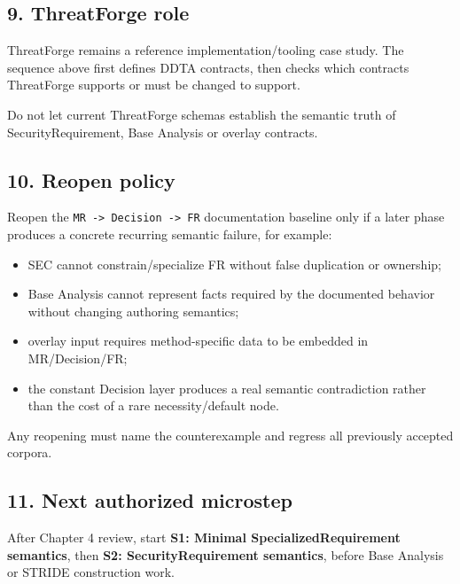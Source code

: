 \documentclass[
  11pt,
  a4paper,
]{article}
\providecommand{\tightlist}{%
  \setlength{\itemsep}{0pt}\setlength{\parskip}{0pt}}
\begin{document}
\subsection{9. ThreatForge role}\label{threatforge-role}

ThreatForge remains a reference implementation/tooling case study. The
sequence above first defines DDTA contracts, then checks which contracts
ThreatForge supports or must be changed to support.

Do not let current ThreatForge schemas establish the semantic truth of
SecurityRequirement, Base Analysis or overlay contracts.

\subsection{10. Reopen policy}\label{reopen-policy}

Reopen the \texttt{MR\ -\textgreater{}\ Decision\ -\textgreater{}\ FR}
documentation baseline only if a later phase produces a concrete
recurring semantic failure, for example:

\begin{itemize}
\tightlist
\item
  SEC cannot constrain/specialize FR without false duplication or
  ownership;
\item
  Base Analysis cannot represent facts required by the documented
  behavior without changing authoring semantics;
\item
  overlay input requires method-specific data to be embedded in
  MR/Decision/FR;
\item
  the constant Decision layer produces a real semantic contradiction
  rather than the cost of a rare necessity/default node.
\end{itemize}

Any reopening must name the counterexample and regress all previously
accepted corpora.

\subsection{11. Next authorized
microstep}\label{next-authorized-microstep}

After Chapter 4 review, start \textbf{S1: Minimal SpecializedRequirement
semantics}, then \textbf{S2: SecurityRequirement semantics}, before Base
Analysis or STRIDE construction work.
\end{document}
